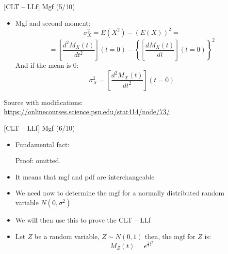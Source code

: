 \documentclass{beamer}
\begin{document}
\begin{frame}
{\centerline{[CLT -- LLf] Mgf (5/10)}}

\begin{itemize}
\item Mgf and second moment:
$$ \sigma_X^2 = E(X^2)-(E(X))^2 = $$
$$ = \left [ \frac{d^2M_X(t)}{dt^2} \right ] (t=0) -  \left \{ \left [ \frac{dM_X(t)}{dt} \right ] (t=0) \right \}^2$$
And if the mean is 0:
$$ \sigma_X^2 =  \left [ \frac{d^2M_X(t)}{dt^2} \right ] (t=0) $$


\end{itemize}

\begin{center}
\tiny 
Source with modifications: \url{https://onlinecourses.science.psu.edu/stat414/node/73/}
\end{center}
\end{frame}


\begin{frame}
{\centerline{[CLT -- LLf] Mgf (6/10)}}

\begin{itemize}
\item Fundamental fact:
\begin{center}
\end{center}
Proof: omitted.
\item It means that mgf and pdf are interchangeable
\item We need now to determine the mgf for a normally distributed random variable $N(0,\sigma^2)$
\item We will then use this to prove the CLT -- LLf
\item Let $Z$ be a random variable, $  Z \sim N(0,1) $ then, the mgf for $Z$ is:
$$M_Z(t) = e^{\frac{1}{2}t^2}$$
\end{itemize}

\end{frame}
\end{document}

